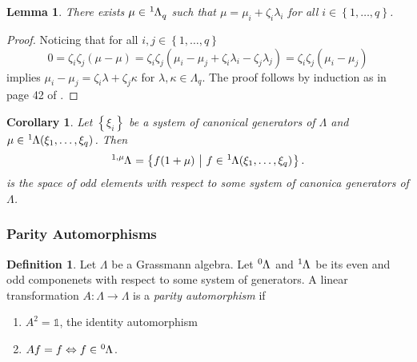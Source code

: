 \documentclass{article}
\newtheorem{lemma}{Lemma}
\newtheorem{corollary}{Corollary}[theorem]
\theoremstyle{definition}
\newtheorem{definition}{Definition}
\begin{document}
\begin{lemma}
    \label{lemma:1}
    There exists $\mu \in \tensor[^1]{\Lambda}{_q}$ such that $\mu = \mu_i + \zeta_i \lambda_i$ for all $i \in \left\{ 1, \dots, q \right\}$.
\end{lemma}
\begin{proof}
    Noticing that for all $i, j \in \left\{ 1, \dots, q \right\}$
    \begin{equation*}
        0 = \zeta_i \zeta_j (\mu - \mu)
        = \zeta_i \zeta_j (\mu_i - \mu_j + \zeta_i \lambda_i - \zeta_j \lambda_j)
        = \zeta_i \zeta_j (\mu_i - \mu_j)
    \end{equation*}
    implies $\mu_i - \mu_j = \zeta_i \lambda + \zeta_j \kappa$ for $\lambda, \kappa \in \Lambda_q$. The proof follows by induction as in page 42 of \cite{berezin_introduction_1987}.
\end{proof}

\begin{corollary}
    Let $\left\{ \xi_i \right\}$ be a system of canonical generators of $\Lambda$ and $\mu \in \tensor[^1]{\Lambda(\xi_1, \dots, \xi_q)}{}$. Then
    \begin{equation*}
        \tensor[^{1, \mu}]{\Lambda}{}
        = \left\{ f(1 + \mu) \ \middle| \ f \in \tensor[^1]{\Lambda(\xi_1, \dots, \xi_q)}{} \right\}.
    \end{equation*}
    is the space of odd elements with respect to some system of canonica generators of $\Lambda$.
\end{corollary}


\subsubsection{Parity Automorphisms}


\begin{definition}
    Let $\Lambda$ be a Grassmann algebra. Let $\tensor[^0]{\Lambda}{}$ and $\tensor[^1]{\Lambda}{}$ be its even and odd componenets with respect to some system of generators. A linear transformation $A: \Lambda \rightarrow \Lambda$ is a \emph{parity automorphism} if
    \begin{enumerate}
        \item $A^2 = \mathds{1}$, the identity automorphism
        \item $A f = f \Leftrightarrow f \in \tensor[^0]{\Lambda}{}$.
    \end{enumerate}
\end{definition}
\end{document}
